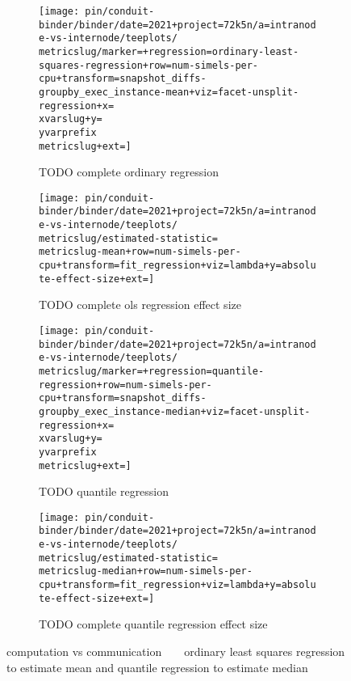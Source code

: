 \begin{figure*}
  \centering

  \begin{subfigure}[b]{0.5\textwidth}
    \centering
    \texttt{[image: pin/conduit-binder/binder/date=2021+project=72k5n/a=intranode-vs-internode/teeplots/\\metricslug/marker=+regression=ordinary-least-squares-regression+row=num-simels-per-cpu+transform=snapshot\_diffs-groupby\_exec\_instance-mean+viz=facet-unsplit-regression+x=\\xvarslug+y=\\yvarprefix\\metricslug+ext=]}
    \caption{TODO complete ordinary regression}
    \label{fig:intranode-vs-internode-regression-ols-\metricslug-complete-regression}
  \end{subfigure}%
  \begin{subfigure}[b]{0.5\textwidth}
    \centering
    \texttt{[image: pin/conduit-binder/binder/date=2021+project=72k5n/a=intranode-vs-internode/teeplots/\\metricslug/estimated-statistic=\\metricslug-mean+row=num-simels-per-cpu+transform=fit\_regression+viz=lambda+y=absolute-effect-size+ext=]}
    \caption{TODO complete ols regression effect size}
    \label{fig:intranode-vs-internode-regression-ols-\metricslug-complete-effect-size}
  \end{subfigure}

  \begin{subfigure}[b]{0.5\textwidth}
    \centering
    \texttt{[image: pin/conduit-binder/binder/date=2021+project=72k5n/a=intranode-vs-internode/teeplots/\\metricslug/marker=+regression=quantile-regression+row=num-simels-per-cpu+transform=snapshot\_diffs-groupby\_exec\_instance-median+viz=facet-unsplit-regression+x=\\xvarslug+y=\\yvarprefix\\metricslug+ext=]}
    \caption{TODO quantile regression}
    \label{fig:intranode-vs-internode-regression-quantile-\metricslug-complete-regression}
  \end{subfigure}%
  \begin{subfigure}[b]{0.5\textwidth}
    \centering
    \texttt{[image: pin/conduit-binder/binder/date=2021+project=72k5n/a=intranode-vs-internode/teeplots/\\metricslug/estimated-statistic=\\metricslug-median+row=num-simels-per-cpu+transform=fit\_regression+viz=lambda+y=absolute-effect-size+ext=]}
    \caption{TODO complete quantile regression effect size}
    \label{fig:intranode-vs-internode-regression-quantile-\metricslug-complete-effect-size}
  \end{subfigure}

  \caption{computation vs communication ~ \metric ~ ordinary least squares regression to estimate mean and quantile regression to estimate median}
  \label{fig:intranode-vs-internode-regression-\metricslug}
\end{figure*}

